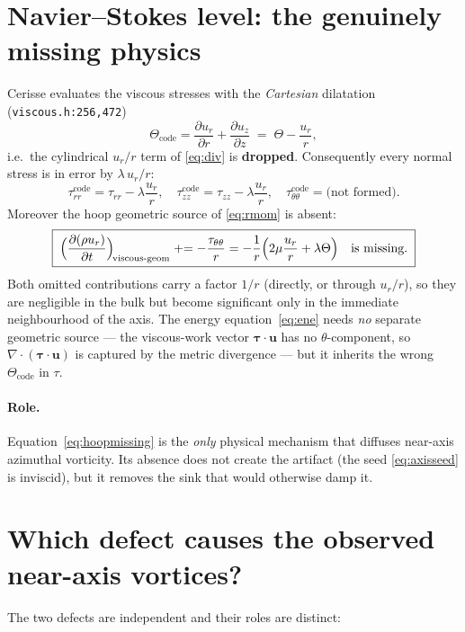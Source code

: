 \documentclass[11pt]{article}
\newcommand{\pd}[2]{\frac{\partial #1}{\partial #2}}
\newcommand{\ur}{u_r}
\newcommand{\uz}{u_z}
\newcommand{\code}[1]{\texttt{\small #1}}
\begin{document}
\section{Navier--Stokes level: the genuinely missing physics}
\label{sec:visc}
Cerisse evaluates the viscous stresses with the \emph{Cartesian}
dilatation (\code{viscous.h:256,472})
\begin{equation}
\Theta_{\text{code}} = \pd{\ur}{r}+\pd{\uz}{z}
   \;=\; \Theta - \frac{\ur}{r},
\end{equation}
i.e.\ the cylindrical $\ur/r$ term of \eqref{eq:div} is \textbf{dropped}.
Consequently every normal stress is in error by $\lambda\,\ur/r$:
\begin{equation}
\tau_{rr}^{\text{code}}=\tau_{rr}-\lambda\frac{\ur}{r},\quad
\tau_{zz}^{\text{code}}=\tau_{zz}-\lambda\frac{\ur}{r},\quad
\tau_{\theta\theta}^{\text{code}}=\text{(not formed)}.
\end{equation}
Moreover the hoop geometric source of \eqref{eq:rmom} is absent:
\begin{equation}
\boxed{\;\Bigl(\pd{(\rho\ur)}{t}\Bigr)_{\!\text{viscous-geom}}
  \mathrel{+}= -\frac{\tau_{\theta\theta}}{r}
  = -\frac{1}{r}\Bigl(2\mu\frac{\ur}{r}+\lambda\Theta\Bigr)
  \quad\text{is missing.}\;}
\label{eq:hoopmissing}
\end{equation}
Both omitted contributions carry a factor $1/r$ (directly, or through
$\ur/r$), so they are negligible in the bulk but become significant only
in the immediate neighbourhood of the axis.  The energy
equation~\eqref{eq:ene} needs \emph{no} separate geometric source --- the
viscous-work vector $\bm\tau\!\cdot\!\bm u$ has no $\theta$-component, so
$\nabla\!\cdot(\bm\tau\!\cdot\!\bm u)$ is captured by the metric divergence
--- but it inherits the wrong $\Theta_{\text{code}}$ in $\tau$.

\paragraph{Role.}  Equation~\eqref{eq:hoopmissing} is the \emph{only}
physical mechanism that diffuses near-axis azimuthal vorticity.  Its
absence does not create the artifact (the seed \eqref{eq:axisseed} is
inviscid), but it removes the sink that would otherwise damp it.

\section{Which defect causes the observed near-axis vortices?}
\label{sec:diag}
The two defects are independent and their roles are distinct:
\end{document}
